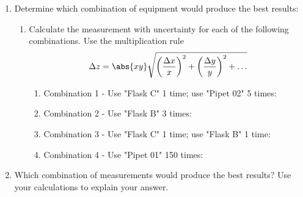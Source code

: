 \begin{enumerate}
	\item Determine which combination of equipment would produce the best results:
	      \begin{enumerate}[label=\alph*.]
		      \item Calculate the measurement with uncertainty for each of the following combinations. Use the multiplication rule
		            \[
			            \Delta z = \abs{ xy } \sqrt{\left( \frac{\Delta x}{x} \right)^2 + \left( \frac{\Delta y}{y} \right)^2 + \ldots}
		            \]
		            \begin{enumerate}
			            \item Combination 1 - Use "Flask C" 1 time; use "Pipet 02" 5 times:
			            \item Combination 2 - Use "Flask B" 3 times:
			            \item Combination 3 - Use "Flask C" 1 time; use "Flask B" 1 time:
			            \item Combination 4 - Use "Pipet 01" 150 times:
		            \end{enumerate}
	      \end{enumerate}
	\item Which combination of measurements would produce the best results? Use your calculations to explain your answer.
\end{enumerate}
